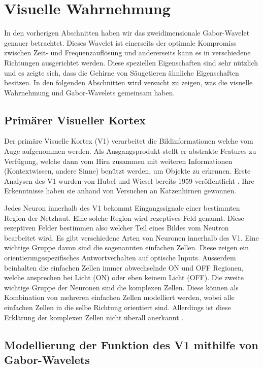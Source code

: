 \section{Visuelle Wahrnehmung}

In den vorherigen Abschnitten haben wir das zweidimensionale Gabor-Wavelet genauer betrachtet.
Dieses Wavelet ist einerseits der optimale Kompromiss zwischen Zeit- und Frequenzauflösung und andererseits kann es in verschiedene Richtungen ausgerichtet werden.
Diese speziellen Eigenschaften sind sehr nützlich und es zeigte sich, dass die Gehirne von Säugetieren ähnliche Eigenschaften besitzen.
In den folgenden Abschnitten wird versucht zu zeigen, was die visuelle Wahrnehmung und Gabor-Wavelets gemeinsam haben. 

\subsection{Primärer Visueller Kortex}\label{subsec:v1}

Der primäre Visuelle Kortex (V1) verarbeitet die Bildinformationen welche vom Auge aufgenommen werden.
Als Ausgangsprodukt stellt er abstrakte Features zu Verfügung, welche dann vom Hirn zusammen mit weiteren Informationen (Kontextwissen, andere Sinne)  benützt werden, um Objekte zu erkennen.
Erste Analysen des V1 wurden von Hubel und Wiesel bereits 1959 veröffentlicht \cite{paper:hubelwiesel}.
Ihre Erkenntnisse haben sie anhand von Versuchen an Katzenhirnen gewonnen.

Jedes Neuron innerhalb des V1 bekommt Eingangssignale einer bestimmten Region der Netzhaut.
Eine solche Region wird rezeptives Feld genannt.
Diese rezeptiven Felder bestimmen also welcher Teil eines Bildes vom Neutron bearbeitet wird.
Es gibt verschiedene Arten von Neuronen innerhalb des V1.
Eine wichtige Gruppe davon sind die sogenannten einfachen Zellen.
Diese zeigen ein orientierungsspezifisches Antwortverhalten auf optische Inputs.
Ausserdem beinhalten die einfachen Zellen immer abwechselnde ON und OFF Regionen, welche ansprechen bei Licht (ON) oder eben keinem Licht (OFF).
Die zweite wichtige Gruppe der Neuronen sind die komplexen Zellen.
Diese können als Kombination von mehreren einfachen Zellen modelliert werden, wobei alle einfachen Zellen in die selbe Richtung orientiert sind.
Allerdings ist diese Erklärung der komplexen Zellen nicht überall anerkannt \cite{book:neuroscience}.


\subsection{Modellierung der Funktion des V1 mithilfe von Gabor-Wavelets}

